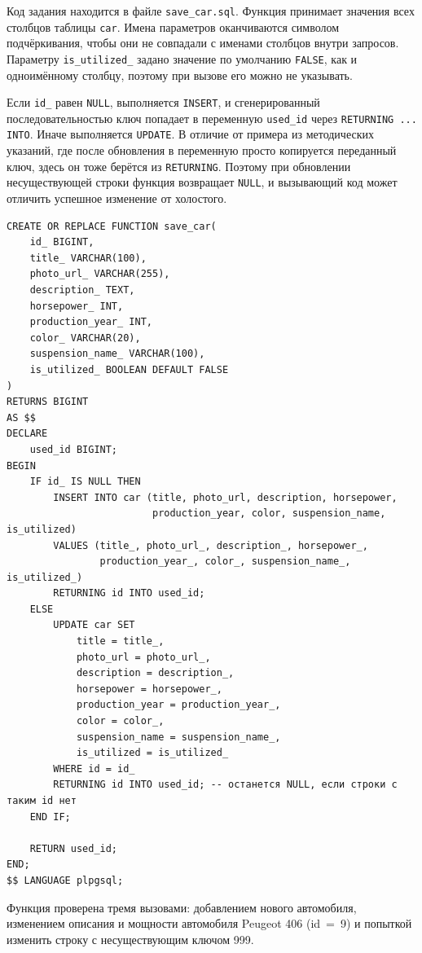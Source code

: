 \documentclass[oneside,a4paper,14pt]{extarticle}
\begin{document}
Код задания находится в файле \texttt{save\_car.sql}. Функция принимает значения всех столбцов таблицы \texttt{car}. Имена параметров оканчиваются символом подчёркивания, чтобы они не совпадали с именами столбцов внутри запросов. Параметру \texttt{is\_utilized\_} задано значение по умолчанию \texttt{FALSE}, как и одноимённому столбцу, поэтому при вызове его можно не указывать.

Если \texttt{id\_} равен \texttt{NULL}, выполняется \texttt{INSERT}, и сгенерированный последовательностью ключ попадает в переменную \texttt{used\_id} через \texttt{RETURNING ... INTO}. Иначе выполняется \texttt{UPDATE}. В отличие от примера из методических указаний, где после обновления в переменную просто копируется переданный ключ, здесь он тоже берётся из \texttt{RETURNING}. Поэтому при обновлении несуществующей строки функция возвращает \texttt{NULL}, и вызывающий код может отличить успешное изменение от холостого.

\begin{verbatim}
CREATE OR REPLACE FUNCTION save_car(
    id_ BIGINT,
    title_ VARCHAR(100),
    photo_url_ VARCHAR(255),
    description_ TEXT,
    horsepower_ INT,
    production_year_ INT,
    color_ VARCHAR(20),
    suspension_name_ VARCHAR(100),
    is_utilized_ BOOLEAN DEFAULT FALSE
)
RETURNS BIGINT
AS $$
DECLARE
    used_id BIGINT;
BEGIN
    IF id_ IS NULL THEN
        INSERT INTO car (title, photo_url, description, horsepower,
                         production_year, color, suspension_name, is_utilized)
        VALUES (title_, photo_url_, description_, horsepower_,
                production_year_, color_, suspension_name_, is_utilized_)
        RETURNING id INTO used_id;
    ELSE
        UPDATE car SET
            title = title_,
            photo_url = photo_url_,
            description = description_,
            horsepower = horsepower_,
            production_year = production_year_,
            color = color_,
            suspension_name = suspension_name_,
            is_utilized = is_utilized_
        WHERE id = id_
        RETURNING id INTO used_id; -- останется NULL, если строки с таким id нет
    END IF;

    RETURN used_id;
END;
$$ LANGUAGE plpgsql;
\end{verbatim}

Функция проверена тремя вызовами: добавлением нового автомобиля, изменением описания и мощности автомобиля Peugeot 406 (id~=~9) и попыткой изменить строку с несуществующим ключом 999.
\end{document}
